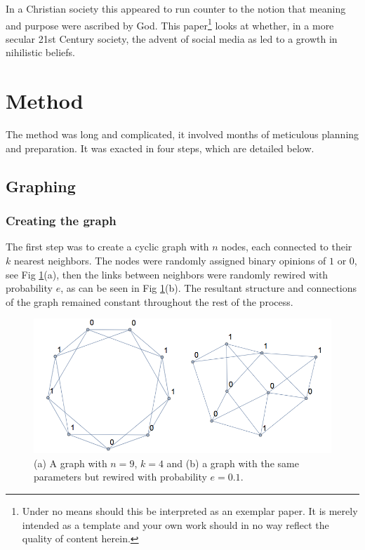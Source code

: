 \documentclass[a4paper, 10pt]{IEEEtran}
\begin{document}
In a Christian society this appeared to run counter to the notion that meaning and purpose were ascribed by God. This paper\footnote{Under no means should this be interpreted as an exemplar paper. It is merely intended as a template and your own work should in no way reflect the quality of content herein.} looks at whether, in a more secular 21st Century society, the advent of social media as led to a growth in nihilistic beliefs.

\section{Method}
\label{sec:method}

The method was long and complicated, it involved months of meticulous planning and preparation. It was exacted in four steps, which are detailed below.

\subsection{Graphing}
\label{sub:graphing}


\subsubsection{Creating the graph}
\label{subsub:creation}

The first step was to create a cyclic graph with $n$ nodes, each connected to their $k$ nearest neighbors. The nodes were randomly assigned binary opinions of $1$ or $0$, see Fig \ref{fig:graphing}(a), then the links between neighbors were randomly rewired with probability $e$, as can be seen in Fig \ref{fig:graphing}(b). The resultant structure and connections of the graph remained constant throughout the rest of the process.\par

\begin{figure}[H]
\centering
\includegraphics[width=\linewidth]{graphs.png}
\caption{(a) A graph with $n = 9$, $k = 4$ and (b) a graph with the same parameters but rewired with probability $e = 0.1$.}
\label{fig:graphing}
\end{figure}
\end{document}
